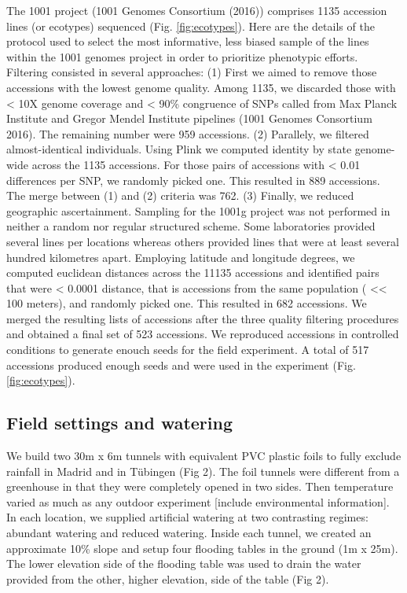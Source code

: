 \documentclass[12pt,]{article}
\begin{document}
The 1001 project (1001 Genomes Consortium (2016)) comprises 1135
accession lines (or ecotypes) sequenced (Fig. \ref{fig:ecotypes}). Here
are the details of the protocol used to select the most informative,
less biased sample of the lines within the 1001 genomes project in order
to prioritize phenotypic efforts. Filtering consisted in several
approaches: (1) First we aimed to remove those accessions with the
lowest genome quality. Among 1135, we discarded those with \textless{}
10X genome coverage and \textless{} 90\% congruence of SNPs called from
Max Planck Institute and Gregor Mendel Institute pipelines (1001 Genomes
Consortium 2016). The remaining number were 959 accessions. (2)
Parallely, we filtered almost-identical individuals. Using Plink we
computed identity by state genome-wide across the 1135 accessions. For
those pairs of accessions with \textless{} 0.01 differences per SNP, we
randomly picked one. This resulted in 889 accessions. The merge between
(1) and (2) criteria was 762. (3) Finally, we reduced geographic
ascertainment. Sampling for the 1001g project was not performed in
neither a random nor regular structured scheme. Some laboratories
provided several lines per locations whereas others provided lines that
were at least several hundred kilometres apart. Employing latitude and
longitude degrees, we computed euclidean distances across the 11135
accessions and identified pairs that were \textless{} 0.0001 distance,
that is accessions from the same population ( \textless{}\textless{} 100
meters), and randomly picked one. This resulted in 682 accessions. We
merged the resulting lists of accessions after the three quality
filtering procedures and obtained a final set of 523 accessions. We
reproduced accessions in controlled conditions to generate enouch seeds
for the field experiment. A total of 517 accessions produced enough
seeds and were used in the experiment (Fig. \ref{fig:ecotypes}).

\subsection{Field settings and
watering}\label{field-settings-and-watering}

We build two 30m x 6m tunnels with equivalent PVC plastic foils to fully
exclude rainfall in Madrid and in Tübingen (Fig 2). The foil tunnels
were different from a greenhouse in that they were completely opened in
two sides. Then temperature varied as much as any outdoor experiment
{[}include environmental information{]}. In each location, we supplied
artificial watering at two contrasting regimes: abundant watering and
reduced watering. Inside each tunnel, we created an approximate 10\%
slope and setup four flooding tables in the ground (1m x 25m). The lower
elevation side of the flooding table was used to drain the water
provided from the other, higher elevation, side of the table (Fig 2).
\end{document}
